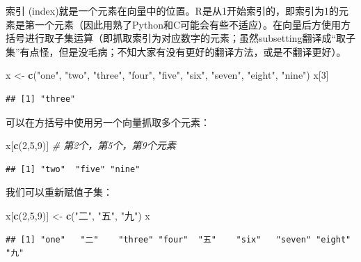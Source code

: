\documentclass[]{book}
\newenvironment{Shaded}{\begin{snugshade}}{\end{snugshade}}
\newcommand{\CommentTok}[1]{\textcolor[rgb]{0.56,0.35,0.01}{\textit{#1}}}
\newcommand{\DecValTok}[1]{\textcolor[rgb]{0.00,0.00,0.81}{#1}}
\newcommand{\KeywordTok}[1]{\textcolor[rgb]{0.13,0.29,0.53}{\textbf{#1}}}
\newcommand{\NormalTok}[1]{#1}
\newcommand{\StringTok}[1]{\textcolor[rgb]{0.31,0.60,0.02}{#1}}
\begin{document}
索引 (index)就是一个元素在向量中的位置。R是从1开始索引的，即索引为1的元素是第一个元素（因此用熟了Python和C可能会有些不适应）。在向量后方使用方括号进行取子集运算（即抓取索引为对应数字的元素；虽然subsetting翻译成``取子集''有点怪，但是没毛病；不知大家有没有更好的翻译方法，或是不翻译更好）。

\begin{Shaded}
\begin{Highlighting}[]
\NormalTok{x <-}\StringTok{ }\KeywordTok{c}\NormalTok{(}\StringTok{"one"}\NormalTok{, }\StringTok{"two"}\NormalTok{, }\StringTok{"three"}\NormalTok{, }\StringTok{"four"}\NormalTok{, }\StringTok{"five"}\NormalTok{, }\StringTok{"six"}\NormalTok{, }\StringTok{"seven"}\NormalTok{, }\StringTok{"eight"}\NormalTok{, }\StringTok{"nine"}\NormalTok{)}
\NormalTok{x[}\DecValTok{3}\NormalTok{]}
\end{Highlighting}
\end{Shaded}

\begin{verbatim}
## [1] "three"
\end{verbatim}

可以在方括号中使用另一个向量抓取多个元素：

\begin{Shaded}
\begin{Highlighting}[]
\NormalTok{x[}\KeywordTok{c}\NormalTok{(}\DecValTok{2}\NormalTok{,}\DecValTok{5}\NormalTok{,}\DecValTok{9}\NormalTok{)] }\CommentTok{# 第2个，第5个，第9个元素}
\end{Highlighting}
\end{Shaded}

\begin{verbatim}
## [1] "two"  "five" "nine"
\end{verbatim}

我们可以重新赋值子集：

\begin{Shaded}
\begin{Highlighting}[]
\NormalTok{x[}\KeywordTok{c}\NormalTok{(}\DecValTok{2}\NormalTok{,}\DecValTok{5}\NormalTok{,}\DecValTok{9}\NormalTok{)] <-}\StringTok{ }\KeywordTok{c}\NormalTok{(}\StringTok{"二"}\NormalTok{, }\StringTok{"五"}\NormalTok{, }\StringTok{"九"}\NormalTok{)}
\NormalTok{x}
\end{Highlighting}
\end{Shaded}

\begin{verbatim}
## [1] "one"   "二"    "three" "four"  "五"    "six"   "seven" "eight" "九"
\end{verbatim}
\end{document}
